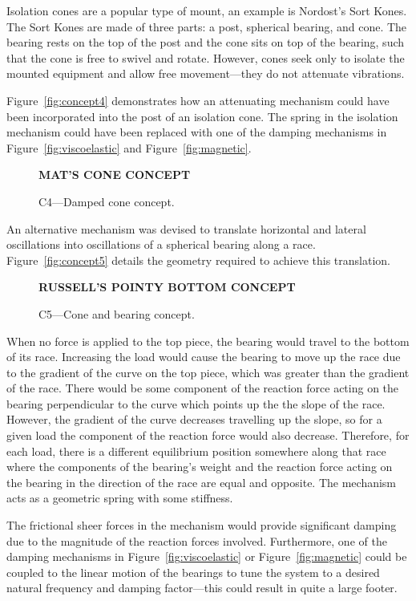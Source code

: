 \documentclass[11pt]{article}
\begin{document}
Isolation cones are a popular type of mount, an example is Nordost's Sort 
Kones\textregistered. The Sort Kones are made of three parts: a post, spherical 
bearing, and cone. The bearing rests on the top of the post and the cone sits 
on top of the bearing, such that the cone is free to swivel and rotate. 
However, cones seek only to isolate the mounted equipment and allow free 
movement---they do not attenuate vibrations.

Figure~\vref{fig:concept4} demonstrates how an attenuating mechanism could have 
been incorporated into the post of an isolation cone. The spring in the 
isolation mechanism could have been replaced with one of the damping mechanisms 
in Figure~\ref{fig:viscoelastic} and Figure~\ref{fig:magnetic}.

    
\begin{figure}[h]
    \centering
    \textbf{MAT'S CONE CONCEPT}
    \caption{C4---Damped cone concept.}
    \label{fig:concept4}
\end{figure}
    
An alternative mechanism was devised to translate horizontal and lateral 
oscillations into oscillations of a spherical bearing along a race. 
Figure~\vref{fig:concept5} details the geometry required to achieve this 
translation.

\begin{figure}[h]
    \centering
    \textbf{RUSSELL'S POINTY BOTTOM CONCEPT}
    \caption{C5---Cone and bearing concept.}
    \label{fig:concept5}
\end{figure}

When no force is applied to the top piece, the bearing would travel to the 
bottom of its race. Increasing the load would cause the bearing to move up the 
race due to the gradient of the curve on the top piece, which was greater than 
the gradient of the race. There would be some component of the reaction force 
acting on the bearing perpendicular to the curve which points up the the slope 
of the race. However, the gradient of the curve decreases travelling up the 
slope, so for a given load the component of the reaction force would also 
decrease. Therefore, for each load, there is a different equilibrium position 
somewhere along that race where the components of the bearing's weight and the 
reaction force acting on the bearing in the direction of the race are equal and 
opposite. The mechanism acts as a geometric spring with some stiffness.

The frictional sheer forces in the mechanism would provide significant damping 
due to the magnitude of the reaction forces involved. Furthermore, one of the 
damping mechanisms in Figure~\ref{fig:viscoelastic} or 
Figure~\ref{fig:magnetic} could be coupled to the linear motion of the 
bearings to tune the system to a desired natural frequency and damping 
factor---this could result in quite a large footer.
\end{document}
